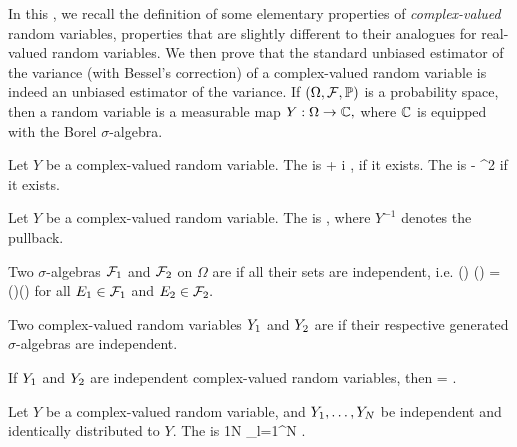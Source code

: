In this , we recall the definition of some elementary properties of \emph{complex-valued} random variables, properties that are slightly different to their analogues for real-valued random variables. We then prove that the standard unbiased estimator of the variance (with Bessel's correction) of a complex-valued random variable  is indeed an unbiased estimator of the variance.
If $\OFP$ is a probability space, then a  random variable is a measurable map $Y:\Omega\rightarrow \mathbb C,$ where $\mathbb C$ is equipped with the Borel $\sigma$-algebra.
\ede

Let $Y$ be a complex-valued random variable. The  is
\beqs
{} \de {} + i ,
\eeqs
if it exists. The  is
\beqs
{} \de {} - ^2
\eeqs
if it exists.
\ede

Let $Y$ be a complex-valued random variable. The  is
\beqs
{} \de {},
\eeqs
where $Y^{-1}$ denotes the pullback.
\ede

Two $\sigma$-algebras $\mathcal F_{1}$ and $\mathcal F_{2}$ on $\Omega$ are  if all their sets are independent, i.e.
\beqs
\PP\mleft(\Eo\mright) \cap \PP\mleft(\Et\mright) = \PP\mleft(\Eo\mright)\PP\mleft(\Et\mright)
\eeqs
for all $E_{1} \in \mathcal F_{1}$ and $E_{2} \in \mathcal F_{2}.$
\ede

Two complex-valued random variables $Y_{1}$ and $Y_{2}$ are  if their respective generated $\sigma$-algebras are independent.
\ede

If $Y_{1}$ and $Y_{2}$ are independent complex-valued random variables, then
\beqs
\EXP{\Yo\Ytbar} = \EXP{\Yo}\EXP{\Ytbar}.
\eeqs
\ele

Let $Y$ be a complex-valued random variable, and $Y_{1},\ldots,Y_{N}$ be independent and identically distributed to $Y$. The  is
\beqs
\Yhat \de\frac1N \sum_{l=1}^N \Yl.
\eeqs
\ede

